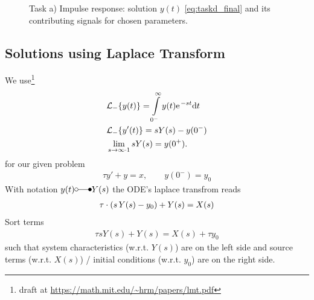 \documentclass[11pt,a4paper,DIV=12]{scrartcl}
\begin{document}
\begin{figure}[h!]
\centering
\caption{Task a) Impulse response: solution $y(t)$ \eqref{eq:taskd_final} and its contributing signals for chosen parameters.}
\end{figure}





\subsection{Solutions using Laplace Transform}
%
We use\footnote{\cite{Lundberg2007} draft at \url{https://math.mit.edu/~hrm/papers/lmt.pdf}}
\begin{align}
&\mathcal{L}_-\{y(t)\}	= \int\limits_{0^-}^{\infty} y(t) \e^{-s t} \fsd t\\
&\mathcal{L}_-\{y'(t)\} = s Y(s) - y(0^-)\\
&\lim_{s \to \infty \cdot 1} s Y(s) = y(0^+).
\end{align}
for our given problem
\begin{align}
\tau y' + y = x, \qquad y(0^-) = y_0
\end{align}
With notation $y(t) \laplace Y(s)$ the ODE's laplace transfrom reads
\begin{align}
\tau \cdot \large(s \, Y(s) - y_0\large) + Y(s) = X(s)
\end{align}
Sort terms
\begin{align}
\tau s Y(s) + Y(s) = X(s) + \tau y_0
\label{eq:laplace_ansatz}
\end{align}
such that system characteristics (w.r.t. $Y(s)$) are on the left side and source terms (w.r.t. $X(s)$) / initial conditions (w.r.t. $y_0$) are on the right side.
\end{document}
